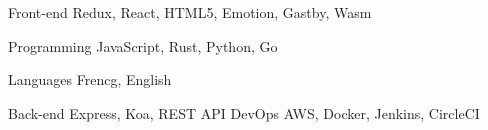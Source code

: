 

\begin{cvskills}

  \cvskill
    {Front-end} %
    {Redux, React, HTML5, Emotion, Gastby, Wasm} %

  \cvskill
    {Programming} %
    {JavaScript, Rust, Python, Go} %

  \cvskill
    {Languages} %
    {Frencg, English} %

\cvskill
  {Back-end} %
  {Express, Koa, REST API} %
\cvskill
  {DevOps} %
  {AWS, Docker, Jenkins, CircleCI} %

\end{cvskills}
